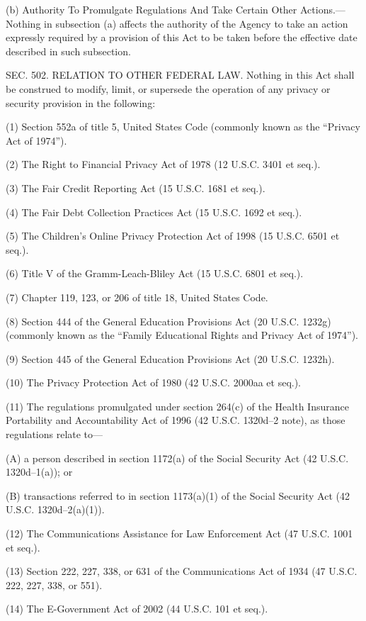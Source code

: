 (b) Authority To Promulgate Regulations And Take Certain Other Actions.—Nothing in subsection (a) affects the authority of the Agency to take an action expressly required by a provision of this Act to be taken before the effective date described in such subsection.


SEC. 502. RELATION TO OTHER FEDERAL LAW.
Nothing in this Act shall be construed to modify, limit, or supersede the operation of any privacy or security provision in the following:

(1) Section 552a of title 5, United States Code (commonly known as the “Privacy Act of 1974”).

(2) The Right to Financial Privacy Act of 1978 (12 U.S.C. 3401 et seq.).

(3) The Fair Credit Reporting Act (15 U.S.C. 1681 et seq.).

(4) The Fair Debt Collection Practices Act (15 U.S.C. 1692 et seq.).

(5) The Children’s Online Privacy Protection Act of 1998 (15 U.S.C. 6501 et seq.).

(6) Title V of the Gramm-Leach-Bliley Act (15 U.S.C. 6801 et seq.).

(7) Chapter 119, 123, or 206 of title 18, United States Code.

(8) Section 444 of the General Education Provisions Act (20 U.S.C. 1232g) (commonly known as the “Family Educational Rights and Privacy Act of 1974”).

(9) Section 445 of the General Education Provisions Act (20 U.S.C. 1232h).

(10) The Privacy Protection Act of 1980 (42 U.S.C. 2000aa et seq.).

(11) The regulations promulgated under section 264(c) of the Health Insurance Portability and Accountability Act of 1996 (42 U.S.C. 1320d–2 note), as those regulations relate to—

(A) a person described in section 1172(a) of the Social Security Act (42 U.S.C. 1320d–1(a)); or

(B) transactions referred to in section 1173(a)(1) of the Social Security Act (42 U.S.C. 1320d–2(a)(1)).

(12) The Communications Assistance for Law Enforcement Act (47 U.S.C. 1001 et seq.).

(13) Section 222, 227, 338, or 631 of the Communications Act of 1934 (47 U.S.C. 222, 227, 338, or 551).

(14) The E-Government Act of 2002 (44 U.S.C. 101 et seq.).

